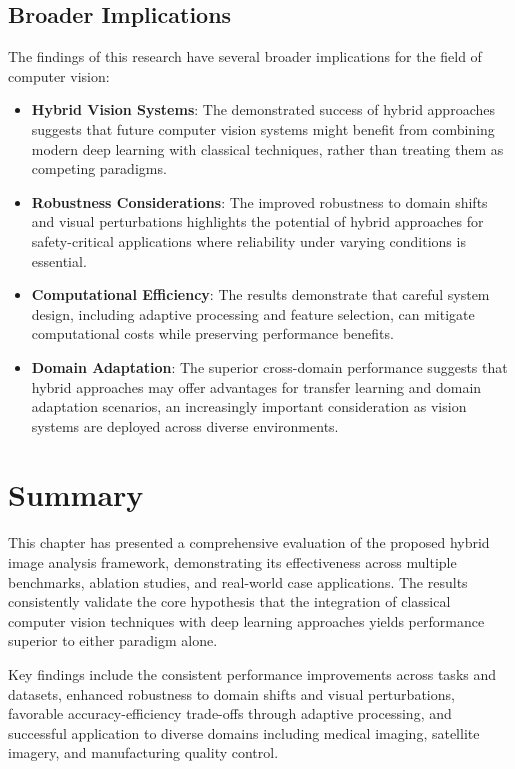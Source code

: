 \subsection{Broader Implications}
The findings of this research have several broader implications for the field of computer vision:

\begin{itemize}
    \item \textbf{Hybrid Vision Systems}: The demonstrated success of hybrid approaches suggests that future computer vision systems might benefit from combining modern deep learning with classical techniques, rather than treating them as competing paradigms.
    
    \item \textbf{Robustness Considerations}: The improved robustness to domain shifts and visual perturbations highlights the potential of hybrid approaches for safety-critical applications where reliability under varying conditions is essential.
    
    \item \textbf{Computational Efficiency}: The results demonstrate that careful system design, including adaptive processing and feature selection, can mitigate computational costs while preserving performance benefits.
    
    \item \textbf{Domain Adaptation}: The superior cross-domain performance suggests that hybrid approaches may offer advantages for transfer learning and domain adaptation scenarios, an increasingly important consideration as vision systems are deployed across diverse environments.
\end{itemize}

\section{Summary}
This chapter has presented a comprehensive evaluation of the proposed hybrid image analysis framework, demonstrating its effectiveness across multiple benchmarks, ablation studies, and real-world case applications. The results consistently validate the core hypothesis that the integration of classical computer vision techniques with deep learning approaches yields performance superior to either paradigm alone.

Key findings include the consistent performance improvements across tasks and datasets, enhanced robustness to domain shifts and visual perturbations, favorable accuracy-efficiency trade-offs through adaptive processing, and successful application to diverse domains including medical imaging, satellite imagery, and manufacturing quality control.

